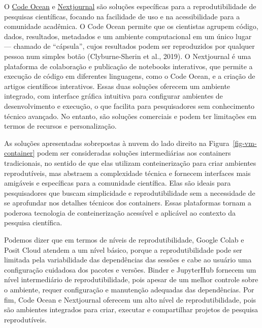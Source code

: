 \documentclass[
  a4paper,
]{article}
\begin{document}
O \href{https://codeocean.com/}{Code Ocean} e
\href{https://nextjournal.com/}{Nextjournal} são soluções específicas
para a reprodutibilidade de pesquisas científicas, focando na facilidade
de uso e na acessibilidade para a comunidade acadêmica. O Code Ocean
permite que os cientistas agrupem código, dados, resultados, metadados e
um ambiente computacional em um único lugar --- chamado de ``cápsula'',
cujos resultados podem ser reproduzidos por qualquer pessoa num simples
botão (Clyburne-Sherin et al., 2019). O Nextjournal é uma plataforma de
colaboração e publicação de notebooks interativos, que permite a
execução de código em diferentes linguagens, como o Code Ocean, e a
criação de artigos científicos interativos. Essas duas soluções oferecem
um ambiente integrado, com interface gráfica intuitiva para configurar
ambientes de desenvolvimento e execução, o que facilita para
pesquisadores sem conhecimento técnico avançado. No entanto, são
soluções comerciais e podem ter limitações em termos de recursos e
personalização.

As soluções apresentadas sobrepostas à nuvem do lado direito na
Figura~\ref{fig-vm-container} podem ser consideradas soluções
intermediárias aos containers tradicionais, no sentido de que elas
utilizam conteinerização para criar ambientes reprodutíveis, mas
abstraem a complexidade técnica e fornecem interfaces mais amigáveis e
específicas para a comunidade científica. Elas são ideais para
pesquisadores que buscam simplicidade e reprodutibilidade sem a
necessidade de se aprofundar nos detalhes técnicos dos containers. Essas
plataformas tornam a poderosa tecnologia de conteinerização acessível e
aplicável ao contexto da pesquisa científica.

Podemos dizer que em termos de níveis de reprodutibilidade, Google Colab
e Posit Cloud atendem a um nível básico, porque a reprodutibilidade pode
ser limitada pela variabilidade das dependências das sessões e cabe ao
usuário uma configuração cuidadosa dos pacotes e versões. Binder e
JupyterHub fornecem um nível intermediário de reprodutibilidade, pois
apesar de um melhor controle sobre o ambiente, requer configuração e
manutenção adequadas das dependências. Por fim, Code Ocean e Nextjournal
oferecem um alto nível de reprodutibilidade, pois são ambientes
integrados para criar, executar e compartilhar projetos de pesquisa
reprodutíveis.
\end{document}
